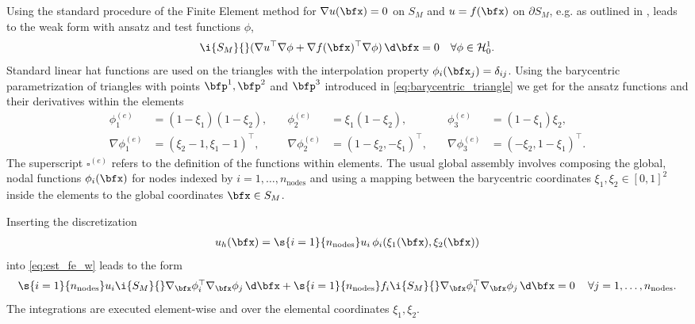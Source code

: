 Using the standard procedure of the Finite Element method for $\nabla u(\bfx) = 0$ on $S_M$ and $u=f(\bfx)$ on $∂S_M$, e.g. as outlined in \cite{Remacle2010}, leads to the weak form with ansatz and test functions $\phi$,
\begin{align}\label{eq:est_fe_w}
    \i{S_M}{} (\nabla u^\top \nabla \phi + \nabla f(\bfx)^\top \nabla \phi) \,\d \bfx = 0 \quad \forall \phi \in \mathcal{H}_0^1.
\end{align}
Standard linear hat functions are used on the triangles with the interpolation property $\phi_i(\bfx_j) = \delta_{ij}$. Using the barycentric parametrization of triangles with points $\bfp^1,\bfp^2$ and $\bfp^3$ introduced in \cref{eq:barycentric_triangle} we get for the ansatz functions and their derivatives within the elements
%
\begin{align*}
  \phi^{(e)}_1 &= (1 - \xi_1)(1 - \xi_2), \quad&
  \phi^{(e)}_2 &= \xi_1 (1 - \xi_2), \quad &
  \phi^{(e)}_3 &= (1 - \xi_1) \xi_2,\\[4mm]
  \nabla \phi^{(e)}_1 &= (\xi_2-1, \xi_1 - 1)^\top, \quad&
  \nabla \phi^{(e)}_2 &= (1-\xi_2, -\xi_1)^\top, \quad&
  \nabla \phi^{(e)}_3 &= (-\xi_2, 1-\xi_1)^\top.
\end{align*}
The superscript $\square^{(e)}$ refers to the definition of the functions within elements. The usual global assembly involves composing the global, nodal functions $\phi_i(\bfx)$ for nodes indexed by $i=1, \dots, n_\text{nodes}$ and using a mapping between the barycentric coordinates $\xi_1,\xi_2 \in [0,1]^2$ inside the elements to the global coordinates $\bfx \in S_M$.

Inserting the discretization
\begin{align*}
  u_h(\bfx) = \s{i=1}{n_\text{nodes}} u_i\,\phi_i(\xi_1(\bfx), \xi_2(\bfx))
\end{align*}
into \cref{eq:est_fe_w} leads to the form
\begin{equation}\label{eq:est_weak_form}
  \begin{array}{lll}
    \s{i=1}{n_\text{nodes}}u_i \i{S_M}{} \nabla_\bfx \phi_i^\top \nabla_\bfx \phi_j \,\d\bfx + \s{i=1}{n_\text{nodes}} f_i \i{S_M}{} \nabla_\bfx \phi_i^\top \nabla_\bfx \phi_j \,\d \bfx = 0\,\quad \forall j=1,\dots,n_\text{nodes}.
  \end{array}
\end{equation}
The integrations are executed element-wise and over the elemental coordinates $\xi_1,\xi_2$. 

